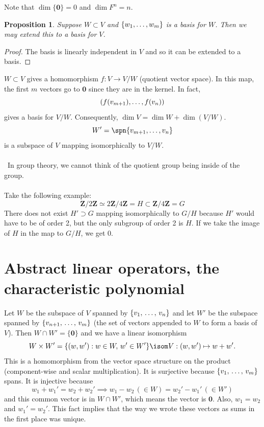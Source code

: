 \documentclass[11pt, oneside]{amsart}
\numberwithin{equation}{section}
\numberwithin{theorem}{section}
\newtheorem{proposition}[theorem]{Proposition}
\theoremstyle{definition}
\let\bf\relax
\def\Z{\mathbf{Z}}
\def\0{\mathbf{0}}
\begin{document}
Note that $\dim\{\0\}=0$ and $\dim F^n =n$.

\begin{proposition}Suppose $W\subset V$ and $\{\bf{w}_1,\hdots,\bf{w}_m\}$ is a basis for $W$. Then we may extend this to a basis for $V$.\end{proposition}\begin{proof} The basis is linearly independent in $V$ and so it can be extended to a basis.\end{proof}%

$W\subset V$ gives a homomorphism $f: V\to V/W$ (quotient vector space). In this map, the first $m$ vectors go to $\0$ since they are in the kernel. In fact, 
$$
(f(\bf{v}_{m+1}),\hdots,f(\bf{v}_n))
$$
gives a basis for $V/W$. Consequently, $\dim V = \dim W + \dim (V/W)$. $$W'=\spn\{\bf{v}_{m+1},\hdots,\bf{v}_n\}$$ is a subspace of $V$ mapping isomorphically to $V/W$.\\\\
\dbend \ In group theory, we cannot think of the quotient group being inside of the group. \\\\Take the following example:
$$
\Z/2\Z\simeq 2\Z/4\Z =H \subset \Z/4\Z =G
$$
There does not exist $H'\supset G$ mapping isomorphically to $G/H$ because $H'$ would have to be of order 2, but the only subgroup of order 2 is $H$. If we take the image of $H$ in the map to $G/H$, we get 0.


\section{Abstract linear operators, the characteristic polynomial}

Let $W$ be the subspace of $V$ spanned by $\{\bf{v}_1,\,\hdots,\, \bf{v}_n\}$ and let $W'$ be the subspace spanned by $\{\bf{v}_{n+1},\, \hdots,\, \bf{v}_m\}$ (the set of vectors appended to $W$ to form a basis of $V$). Then $W\cap W' = \{\0\}$ and we have a linear isomorphism
$$
W\times W' = \{(w,w') : w\in W,\, w'\in W'\} \isom V : (w,w')\mapsto w+w'.
$$
This is a homomorphism from the vector space structure on the product (component-wise and scalar multiplication). It is surjective because $\{\bf{v}_1,\,\hdots,\, \bf{v}_m\}$ spans. It is injective because 
$$
w_1 + w_1' = w_2 + w_2' \implies w_1 - w_2\, (\in W) = w_2' - w_1'\, (\in W')
$$ 
and this common vector is in $W\cap W'$, which means the vector is $\0$. Also, $w_1 = w_2$ and $w_1' = w_2'$. This fact implies that the way we wrote these vectors as sums in the first place was unique.
\end{document}
